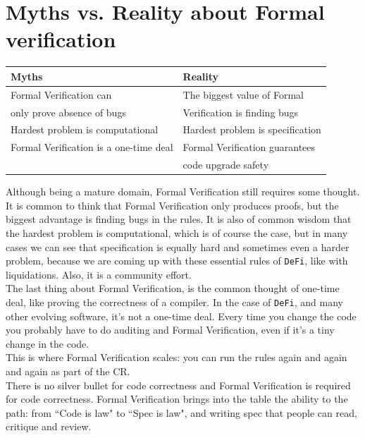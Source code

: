 \documentclass[oneside]{book}
\begin{document}
    \section{Myths vs. Reality about Formal verification}

    \begin{table}[htbp!]
        \centering
        \begin{tabular}{|l|l|}
            \hline
            \textbf{Myths}&\textbf{Reality}\\
            \hline
            Formal Verification can & The biggest value of Formal \\
            only prove absence of bugs & Verification is finding bugs\\
            \hline
            Hardest problem is computational & Hardest problem is specification\\
            \hline
            Formal Verification is a one-time deal & Formal Verification guarantees \\
            & code upgrade safety\\
            \hline
        \end{tabular}
    \end{table}


    Although being a mature domain, Formal Verification still requires some thought.\\

    It is common to think that Formal Verification only produces proofs, but the biggest advantage is finding bugs in the rules.
    It is also of common wisdom that the hardest problem is computational, which is of course the case, but in many cases we can see that specification is equally hard and sometimes even a harder problem, because we are coming up with these essential rules of \texttt{DeFi}, like with liquidations.
    Also, it is a community effort.\\

    The last thing about Formal Verification, is the common thought of one-time deal, like proving the correctness of a compiler.
    In the case of \texttt{DeFi}, and many other evolving software, it's not a one-time deal.
    Every time you change the code you probably have to do auditing and Formal Verification, even if it's a tiny change in the code.\\

    This is where Formal Verification scales: you can run the rules again and again and again as part of the CR.\\

    There is no silver bullet for code correctness and Formal Verification is  required for code correctness.
    Formal Verification brings into the table the ability to the path: from ``Code is law" to ``Spec is law", and writing spec that people can read, critique and review.
\end{document}
